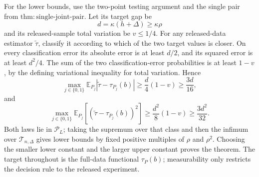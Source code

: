 For the lower bounds, use the two-point testing argument and the single pair from \(\mathrm{thm:single\text{-}joint\text{-}pair}\).  Let its target gap be
\[
 d=\kappa(h+\Delta)\ge\kappa\rho
\]
and its released-sample total variation be \(v\le1/4\).  For any released-data estimator \(\widetilde\tau\), classify it according to which of the two target values is closer.  On every classification error its absolute error is at least \(d/2\), and its squared error is at least \(d^2/4\).  The sum of the two classification-error probabilities is at least \(1-v\), by the defining variational inequality for total variation.  Hence
\[
 \max_{j\in\{0,1\}}\mathbb E_{P_j}|\widetilde\tau-\tau_{P_j}(b)|
 \ge\frac d4(1-v)\ge\frac{3d}{16},
\]
and
\[
 \max_{j\in\{0,1\}}\mathbb E_{P_j}[(\widetilde\tau-\tau_{P_j}(b))^2]
 \ge\frac{d^2}{8}(1-v)\ge\frac{3d^2}{32}.
\]
Both laws lie in \(\mathcal P_L\); taking the supremum over that class and then the infimum over \(\mathcal T_{n,\Delta}\) gives lower bounds by fixed positive multiples of \(\rho\) and \(\rho^2\).  Choosing the smaller lower constant and the larger upper constant proves the theorem.  The target throughout is the full-data functional \(\tau_P(b)\); measurability only restricts the decision rule to the released experiment.